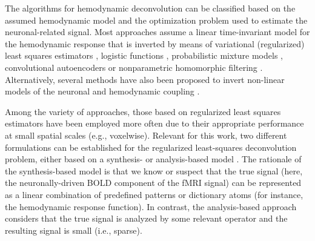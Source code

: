 The algorithms for hemodynamic deconvolution can be classified based on the
assumed hemodynamic model and the optimization problem used to estimate the
neuronal-related signal. Most approaches assume a linear time-invariant model
for the hemodynamic response that is inverted by means of variational
(regularized) least squares estimators
\citep{Glover1999DeconvolutionImpulseResponse,Gitelman2003Modelingregionalpsychophysiologic,
Gaudes2010Detectioncharacterizationsingle,Gaudes2012Structuredsparsedeconvolution,
Gaudes2013Paradigmfreemapping,CaballeroGaudes2019deconvolutionalgorithmmulti,
HernandezGarcia2011Neuronaleventdetection,Karahanoglu2013TotalactivationfMRI,
Cherkaoui2019SparsitybasedBlind,
Huetel2021Hemodynamicmatrixfactorization,Costantini2022Anisotropic4DFiltering},
logistic functions
\citep{Bush2013Decodingneuralevents,Bush2015deconvolutionbasedapproach,
Loula2018DecodingfMRIactivity}, probabilistic mixture models
\citep{Pidnebesna2019EstimatingSparseNeuronal}, convolutional autoencoders
\citep{Huetel2018NeuralActivationEstimation} or nonparametric homomorphic
filtering \citep{Sreenivasan2015NonparametricHemodynamicDeconvolution}.
Alternatively, several methods have also been proposed to invert non-linear
models of the neuronal and hemodynamic coupling
\citep{Riera2004statespacemodel,Penny2005Bilineardynamicalsystems,Friston2008DEMvariationaltreatment,
Havlicek2011Dynamicmodelingneuronal,Aslan2016Jointstateparameter,
Madi2017HybridCubatureKalman,RuizEuler2018NonlinearDeconvolutionSampling}.

Among the variety of approaches, those based on regularized least squares
estimators have been employed more often due to their appropriate performance at
small spatial scales (e.g., voxelwise). Relevant for this work, two different
formulations can be established for the regularized least-squares deconvolution
problem, either based on a synthesis- or analysis-based model
\citep{Elad2007Analysisversussynthesis,ortelli2019synthesis}. The rationale
of the synthesis-based model is that we know or suspect that the true signal
(here, the neuronally-driven BOLD component of the fMRI signal) can be
represented as a linear combination of predefined patterns or dictionary atoms
(for instance, the hemodynamic response function). In contrast, the
analysis-based approach considers that the true signal is analyzed by some
relevant operator and the resulting signal is small (i.e., sparse).

